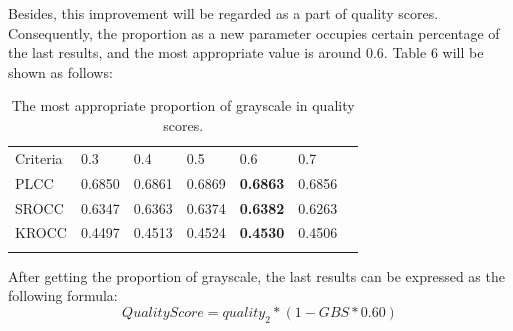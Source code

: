 Besides, this improvement will be regarded as a part of quality scores. Consequently, the proportion as a new parameter occupies certain percentage of the last results, and the most appropriate value is around 0.6. 
Table 6 will be shown as follows:  


\begin{table}
\caption{The most appropriate proportion of grayscale in quality scores.}
\label{tab:5}       
\begin{tabular}{lllllll}
\hline\noalign{\smallskip}
Criteria & 0.3 & 0.4 & 0.5 & 0.6 & 0.7 &\\
\noalign{\smallskip}\hline\noalign{\smallskip}
PLCC	&0.6850    	&0.6861		&0.6869 		&\textbf{0.6863}  	&0.6856	\\
SROCC	&0.6347     	&0.6363		&0.6374 		&\textbf{0.6382}  	&0.6263	\\
KROCC	&0.4497    	&0.4513		&0.4524 		&\textbf{0.4530}  	&0.4506	\\
\noalign{\smallskip}\hline
\end{tabular}
\end{table}



After getting the proportion of grayscale,
the last results can be expressed as the following formula:
\begin{equation}
 QualityScore=quality_2*(1-GBS*0.60)
\end{equation}




